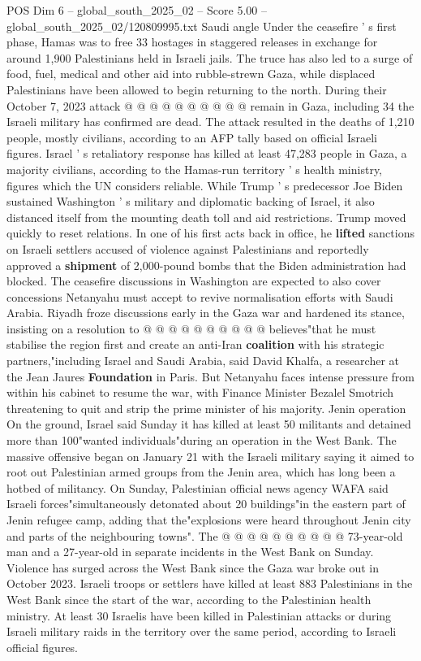 \begin{textsample}{POS Dim 6 – global\_south\_2025\_02 – Score 5.00 – global\_south\_2025\_02/120809995.txt}
Saudi angle Under the ceasefire ' s first phase, Hamas was to free 33 hostages in staggered releases in exchange for around 1,900 Palestinians held in Israeli jails.
The truce has also led to a surge of food, fuel, medical and other aid into rubble-strewn Gaza, while displaced Palestinians have been allowed to begin returning to the north.
During their October 7, 2023 attack @ @ @ @ @ @ @ @ @ @ remain in Gaza, including 34 the Israeli military has confirmed are dead.
The attack resulted in the deaths of 1,210 people, mostly civilians, according to an AFP tally based on official Israeli figures.
Israel ' s retaliatory response has killed at least 47,283 people in Gaza, a majority civilians, according to the Hamas-run territory ' s health ministry, figures which the UN considers reliable.
While Trump ' s predecessor Joe Biden sustained Washington ' s military and diplomatic backing of Israel, it also distanced itself from the mounting death toll and aid restrictions.
Trump moved quickly to reset relations.
In one of his first acts back in office, he \textbf{lifted} sanctions on Israeli settlers accused of violence against Palestinians and reportedly approved a \textbf{shipment} of 2,000-pound bombs that the Biden administration had blocked.
The ceasefire discussions in Washington are expected to also cover concessions Netanyahu must accept to revive normalisation efforts with Saudi Arabia.
Riyadh froze discussions early in the Gaza war and hardened its stance, insisting on a resolution to @ @ @ @ @ @ @ @ @ @ believes"that he must stabilise the region first and create an anti-Iran \textbf{coalition} with his strategic partners,"including Israel and Saudi Arabia, said David Khalfa, a researcher at the Jean Jaures \textbf{Foundation} in Paris.
But Netanyahu faces intense pressure from within his cabinet to resume the war, with Finance Minister Bezalel Smotrich threatening to quit and strip the prime minister of his majority.
Jenin operation On the ground, Israel said Sunday it has killed at least 50 militants and detained more than 100"wanted individuals"during an operation in the West Bank.
The massive offensive began on January 21 with the Israeli military saying it aimed to root out Palestinian armed groups from the Jenin area, which has long been a hotbed of militancy.
On Sunday, Palestinian official news agency WAFA said Israeli forces"simultaneously detonated about 20 buildings"in the eastern part of Jenin refugee camp, adding that the"explosions were heard throughout Jenin city and parts of the neighbouring towns".
The @ @ @ @ @ @ @ @ @ @ 73-year-old man and a 27-year-old in separate incidents in the West Bank on Sunday.
Violence has surged across the West Bank since the Gaza war broke out in October 2023.
Israeli troops or settlers have killed at least 883 Palestinians in the West Bank since the start of the war, according to the Palestinian health ministry.
At least 30 Israelis have been killed in Palestinian attacks or during Israeli military raids in the territory over the same period, according to Israeli official figures.

\end{textsample}
